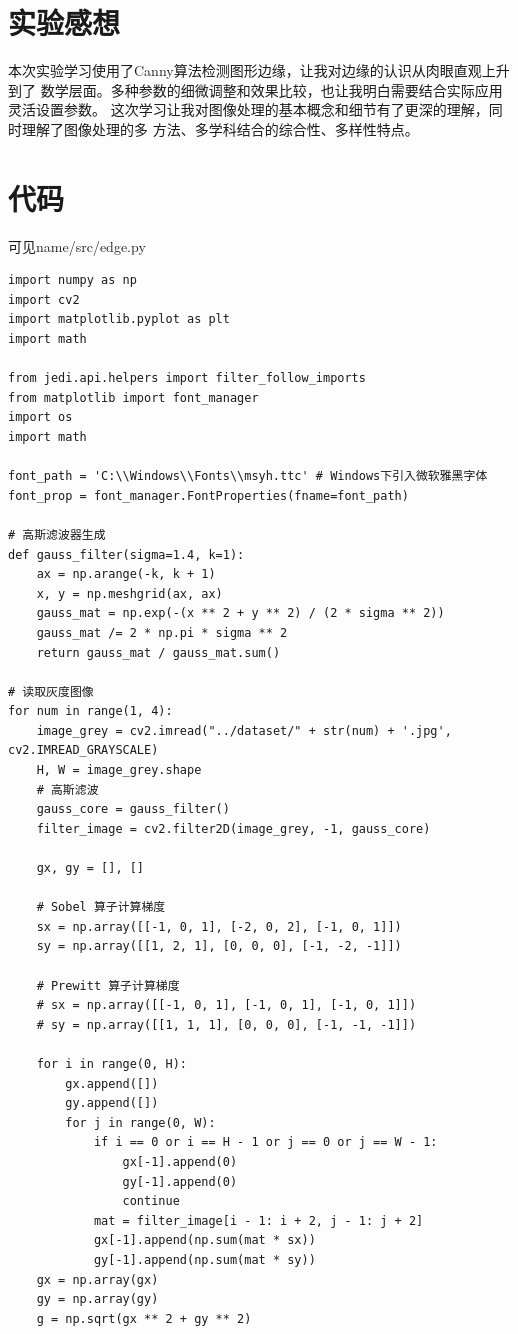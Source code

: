 \documentclass{article}
\begin{document}
\section{实验感想}

    本次实验学习使用了Canny算法检测图形边缘，让我对边缘的认识从肉眼直观上升到了
    数学层面。多种参数的细微调整和效果比较，也让我明白需要结合实际应用灵活设置参数。
    这次学习让我对图像处理的基本概念和细节有了更深的理解，同时理解了图像处理的多
    方法、多学科结合的综合性、多样性特点。

\section{代码}
    可见name/src/edge.py
\begin{lstlisting}
import numpy as np
import cv2
import matplotlib.pyplot as plt
import math

from jedi.api.helpers import filter_follow_imports
from matplotlib import font_manager
import os
import math

font_path = 'C:\\Windows\\Fonts\\msyh.ttc' # Windows下引入微软雅黑字体
font_prop = font_manager.FontProperties(fname=font_path)

# 高斯滤波器生成
def gauss_filter(sigma=1.4, k=1):
    ax = np.arange(-k, k + 1)
    x, y = np.meshgrid(ax, ax)
    gauss_mat = np.exp(-(x ** 2 + y ** 2) / (2 * sigma ** 2))
    gauss_mat /= 2 * np.pi * sigma ** 2
    return gauss_mat / gauss_mat.sum()

# 读取灰度图像
for num in range(1, 4):
    image_grey = cv2.imread("../dataset/" + str(num) + '.jpg', cv2.IMREAD_GRAYSCALE)
    H, W = image_grey.shape
    # 高斯滤波
    gauss_core = gauss_filter()
    filter_image = cv2.filter2D(image_grey, -1, gauss_core)

    gx, gy = [], []

    # Sobel 算子计算梯度
    sx = np.array([[-1, 0, 1], [-2, 0, 2], [-1, 0, 1]])
    sy = np.array([[1, 2, 1], [0, 0, 0], [-1, -2, -1]])

    # Prewitt 算子计算梯度
    # sx = np.array([[-1, 0, 1], [-1, 0, 1], [-1, 0, 1]])
    # sy = np.array([[1, 1, 1], [0, 0, 0], [-1, -1, -1]])

    for i in range(0, H):
        gx.append([])
        gy.append([])
        for j in range(0, W):
            if i == 0 or i == H - 1 or j == 0 or j == W - 1:
                gx[-1].append(0)
                gy[-1].append(0)
                continue
            mat = filter_image[i - 1: i + 2, j - 1: j + 2]
            gx[-1].append(np.sum(mat * sx))
            gy[-1].append(np.sum(mat * sy))
    gx = np.array(gx)
    gy = np.array(gy)
    g = np.sqrt(gx ** 2 + gy ** 2)


\end{lstlisting}
\end{document}
